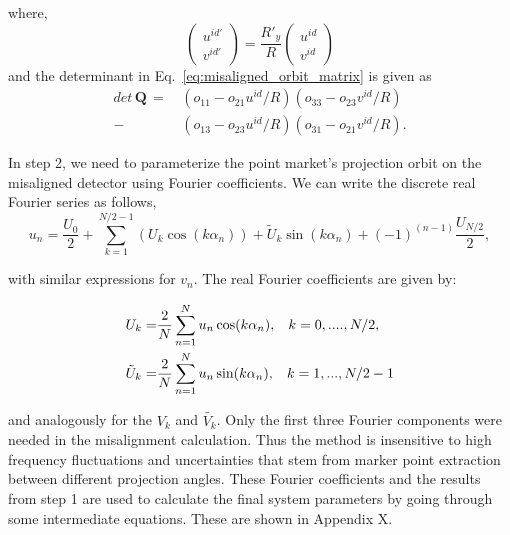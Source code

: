 where, 
\begin{equation}
\begin{pmatrix}
u^{id'} \\
v^{id'}
\end{pmatrix} = \frac{R'_y}{R}
\begin{pmatrix}
u^{id}\\
v^{id}
\end{pmatrix}
\end{equation}
and the determinant in Eq.~\ref{eq:misaligned_orbit_matrix} is given as
\begin{equation}
\begin{aligned}
det \, \mathrm{\mathbf{Q}} \, = \, &(o_{11} - o_{21} u^{id}/R) (o_{33} - o_{23} v^{id}/R) \\
                           - &(o_{13} - o_{23} u^{id}/R) (o_{31} - o_{21} v^{id}/R ).
\end{aligned}
\label{eq:detQ}
\end{equation}

In step 2, we need to parameterize the point market's projection orbit on the misaligned detector using Fourier coefficients.  We can write the discrete real Fourier series as follows, 
\begin{equation}\label{eq:fourierseries}
u_n = \frac{U_0}{2} + \sum ^{N/2-1}_{k=1} (U_k \cos (k\alpha_n)) + \tilde{U}_k \sin (k \alpha_n) + (-1)^{(n-1)} \frac{U_{N/2}}{2}, 
\end{equation}

\noindent with similar expressions for $v_n$.  The real Fourier coefficients are given by:

\begin{equation}\label{eq:fouriercoeff}
\begin{split}
U_k = & \frac{2}{N}\sum_{n=1}^{N} u_n \cos (k \alpha_n), \hspace{0.3cm} k = 0, ...., N/2, \\
\tilde{U}_k = & \frac{2}{N} \sum_{n=1}^{N} u_n \sin (k \alpha_n), \hspace{0.3cm} k = 1,...,N/2-1
\end{split}
\end{equation}

\noindent and analogously for the $V_k$ and $\tilde{V_k}$.  Only the first three Fourier components were needed in the misalignment calculation. Thus the method is insensitive to high frequency fluctuations and uncertainties that stem from marker point extraction between different projection angles.  These Fourier coefficients and the results from step 1 are used to calculate the final system parameters by going through some intermediate equations.  These are shown in Appendix X.

